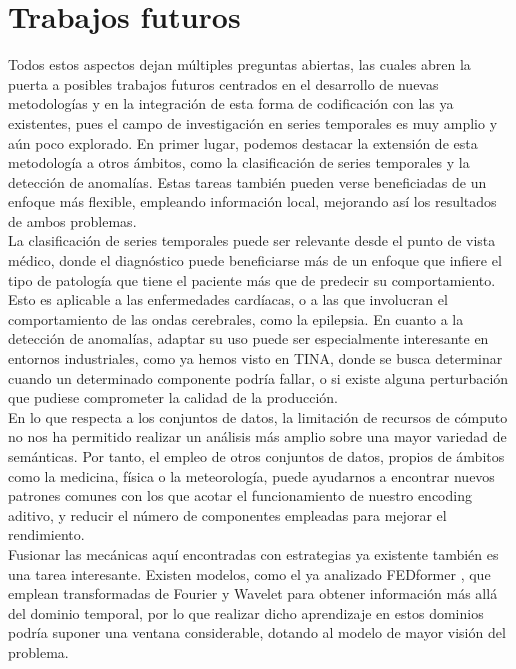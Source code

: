 \section{Trabajos futuros}

Todos estos aspectos dejan múltiples preguntas abiertas, las cuales abren la puerta a posibles trabajos futuros centrados en el desarrollo de nuevas metodologías y en la integración de esta forma de codificación con las ya existentes, pues el campo de investigación en series temporales es muy amplio y aún poco explorado. En primer lugar, podemos destacar la extensión de esta metodología a otros ámbitos, como la clasificación de series temporales y la detección de anomalías. Estas tareas también pueden verse beneficiadas de un enfoque más flexible, empleando información local, mejorando así los resultados de ambos problemas.\\ La clasificación de series temporales puede ser relevante desde el punto de vista médico, donde el diagnóstico puede beneficiarse más de un enfoque que infiere el tipo de patología que tiene el paciente más que de predecir su comportamiento. Esto es aplicable a las enfermedades cardíacas, o a las que involucran el comportamiento de las ondas cerebrales, como la epilepsia. En cuanto a la detección de anomalías, adaptar su uso puede ser especialmente interesante en entornos industriales, como ya hemos visto en TINA, donde se busca determinar cuando un determinado componente podría fallar, o si existe alguna perturbación que pudiese comprometer la calidad de la producción.\\

En lo que respecta a los conjuntos de datos, la limitación de recursos de cómputo no nos ha permitido realizar un análisis más amplio sobre una mayor variedad de semánticas. Por tanto, el empleo de otros conjuntos de datos, propios de ámbitos como la medicina, física o la meteorología, puede ayudarnos a encontrar nuevos patrones comunes con los que acotar el funcionamiento de nuestro encoding aditivo, y reducir el número de componentes empleadas para mejorar el rendimiento.\\

Fusionar las mecánicas aquí encontradas con estrategias ya existente también es una tarea interesante. Existen modelos, como el ya analizado FEDformer \cite{zhou2022fedformerfrequencyenhanceddecomposed}, que emplean transformadas de Fourier y Wavelet para obtener información más allá del dominio temporal, por lo que realizar dicho aprendizaje en estos dominios podría suponer una ventana considerable, dotando al modelo de mayor visión del problema.\\

